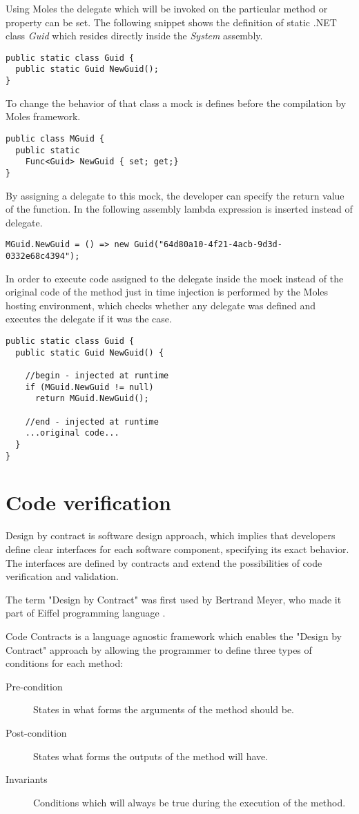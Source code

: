 Using Moles the delegate which will be invoked on the particular method or property can be set. The following snippet shows the definition of static .NET class \textit{Guid} which resides directly inside the \textit{System} assembly.
\begin{verbatim}
public static class Guid { 
  public static Guid NewGuid();
}	
\end{verbatim}
To change the behavior of that class a mock is defines before the compilation by Moles framework.
\begin{verbatim}
public class MGuid { 
  public static 
    Func<Guid> NewGuid { set; get;}
}
\end{verbatim}
By assigning a delegate to this mock, the developer can specify the return value of the function. In the following assembly lambda expression is inserted instead of delegate.
\begin{verbatim}
MGuid.NewGuid = () => new Guid("64d80a10-4f21-4acb-9d3d-0332e68c4394");
\end{verbatim}
In order to execute code assigned to the delegate inside the mock instead of the original code of the method just in time injection is performed by the Moles hosting environment, which checks whether any delegate was defined and executes the delegate if it was the case.
\begin{verbatim}
public static class Guid { 
  public static Guid NewGuid() {
  
    //begin - injected at runtime
    if (MGuid.NewGuid != null)
      return MGuid.NewGuid();
    
    //end - injected at runtime
    ...original code...
  }
}
\end{verbatim}

\section{Code verification}
Design by contract is software design approach, which implies that developers define clear interfaces for each software component, specifying its exact behavior. The interfaces are defined by contracts and extend the possibilities of code verification and validation.

The term "Design by Contract" was first used by Bertrand Meyer, who made it part of Eiffel programming language \cite{Meyer92}.

Code Contracts is a language agnostic framework which enables the "Design by Contract" approach \cite{ContractsManual} by allowing the programmer to define three types of conditions for each method:
\begin{description}
	\item [Pre-condition] States in what forms the arguments of the method should be.
	\item [Post-condition] States what forms the outputs of the method will have.
	\item [Invariants] Conditions which will always be true during the execution of the method.
\end{description}

